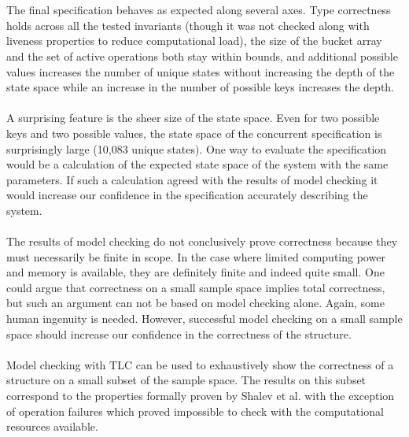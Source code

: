 \documentclass{uit-thesis}
\begin{document}
\\\\
The final specification behaves as expected along several axes. Type correctness holds across all the tested invariants (though it was not checked along with liveness properties to reduce computational load), the size of the bucket array and the set of active operations both stay within bounds, and additional possible values increases the number of unique states without increasing the depth of the state space while an increase in the number of possible keys increases the depth.
\\\\
A surprising feature is the sheer size of the state space. Even for two possible keys and two possible values, the state space of the concurrent specification is surprisingly large (10,083 unique states). One way to evaluate the specification would be a calculation of the expected state space of the system with the same parameters. If such a calculation agreed with the results of model checking it would increase our confidence in the specification accurately describing the system.
\\\\
The results of model checking do not conclusively prove correctness because they must necessarily be finite in scope. In the case where limited computing power and memory is available, they are definitely finite and indeed quite small. One could argue that correctness on a small sample space implies total correctness, but such an argument can not be based on model checking alone. Again, some human ingenuity is needed. However, successful model checking on a small sample space should increase our confidence in the correctness of the structure.
\\\\
Model checking with TLC can be used to exhaustively show the correctness of a structure on a small subset of the sample space. The results on this subset correspond to the properties formally proven by Shalev et al. with the exception of operation failures which proved impossible to check with the computational resources available.
\end{document}
